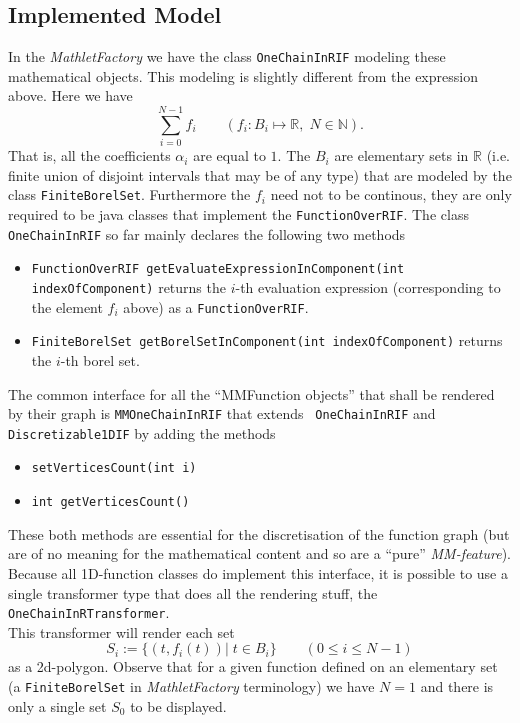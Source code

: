 \documentclass[a4paper,12pt]{book}
\newcommand{\appfac}{\emph{MathletFactory }}
\newcommand{\R}{\mathbb{R}}
\newcommand{\Rtext}{$\mathbb{R}$ }
\begin{document}
\begin{appendix}
\section{Implemented Model}
In the \appfac we have the class {\tt OneChainInRIF} modeling these mathematical objects. This modeling is slightly
different from the expression above. Here we have
\[
\sum_{i=0}^{N-1} f_i \quad\quad (f_i:B_i\mapsto \R,\; N\in\mathbb{N}).
\]
That is, all the coefficients $\alpha_i$ are equal to $1$. The $B_i$ are elementary sets in \Rtext
(i.e. finite union of disjoint intervals that may be of any type) that are modeled by the class {\texttt{FiniteBorelSet}}.
Furthermore the $f_i$ need not to be continous, they are only required to be java classes that implement the {\texttt{FunctionOverRIF}}. \pagebreak
The class {\tt OneChainInRIF} so far mainly declares the following two methods
\begin{itemize}
\item{\texttt{FunctionOverRIF getEvaluateExpressionInComponent(int indexOfComponent)}} returns the $i$-th evaluation expression
  (corresponding to the element $f_i$ above) as a {\tt FunctionOverRIF}.
\item{\texttt{FiniteBorelSet getBorelSetInComponent(int indexOfComponent)}} returns the $i$-th borel set.
\end{itemize}
The common interface for all the ``MMFunction objects'' that shall be rendered by their graph is {\tt MMOneChainInRIF} that extends {\tt
  OneChainInRIF} and {\tt Discretizable1DIF} by adding the methods
\begin{itemize}
\item {\texttt{setVerticesCount(int i)}}
\item {\texttt{int getVerticesCount()}}
\end{itemize}
These both methods are essential for the discretisation of the
function graph (but are of no meaning for the mathematical content and so are a
``pure'' \emph{MM-feature}).\\[1ex]
Because all 1D-function classes do implement this interface, it is possible to use a single
transformer type that does all the rendering stuff, the {\tt OneChainInRTransformer}.\\
This
transformer will render each set 
\[
S_i:= \{(t,f_i(t))|\;t\in B_i\}\quad\quad(0\le i\le N-1)
\]
 as a 2d-polygon. Observe that for a given function defined on an elementary set (a
 {\texttt{FiniteBorelSet}} in \appfac terminology) we have $N=1$ and there is only a single set
   $S_0$ to
   be displayed.\\

\end{appendix}
\end{document}
